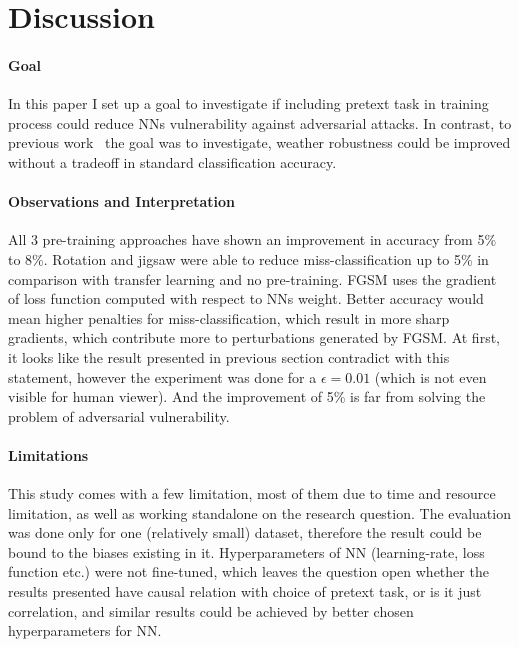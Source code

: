 \section{Discussion}

\paragraph{Goal}
In this paper I set up a goal to investigate if including pretext task in training process could reduce NNs
vulnerability against adversarial attacks.
In contrast, to previous work~\cite{https://doi.org/10.48550/arxiv.1805.12152} the goal was to investigate, weather
robustness could be improved without a tradeoff in standard classification accuracy.

\paragraph{Observations and Interpretation}
All 3 pre-training approaches have shown an improvement in accuracy from 5\% to 8\%.
Rotation and jigsaw were able to reduce miss-classification up to 5\% in comparison with transfer learning and no pre-training.
FGSM uses the gradient of loss function computed with respect to NNs weight.
Better accuracy would mean higher penalties for miss-classification, which result in more sharp gradients, which
contribute more to perturbations generated by FGSM.
At first, it looks like the result presented in previous section contradict with this statement, however
the experiment was done for a $\epsilon = 0.01$ (which is not even visible for human viewer).
And the improvement of 5\% is far from solving the problem of adversarial vulnerability.

\paragraph{Limitations}
This study comes with a few limitation,
most of them due to time and resource limitation, as well as working standalone on the research question.
The evaluation was done only for one (relatively small) dataset, therefore the result could be bound to the biases existing in it.
Hyperparameters of NN (learning-rate, loss function etc.) were not fine-tuned, which leaves the question open whether the
results presented have causal relation with choice of pretext task, or is it just correlation, and similar results could
be achieved by better chosen hyperparameters for NN.

